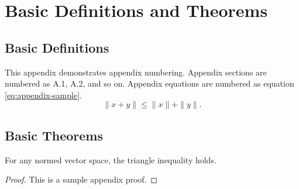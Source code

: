 \chapter{Basic Definitions and Theorems}

\section{Basic Definitions}

This appendix demonstrates appendix numbering. Appendix sections are numbered as A.1, A.2, and so on. Appendix equations are numbered as equation \eqref{eq:appendix-sample}.
\begin{equation}\label{eq:appendix-sample}
  \|x+y\|\le \|x\|+\|y\|.
\end{equation}

\section{Basic Theorems}

\begin{theorem}
For any normed vector space, the triangle inequality holds.
\end{theorem}

\begin{proof}
This is a sample appendix proof.
\end{proof}
